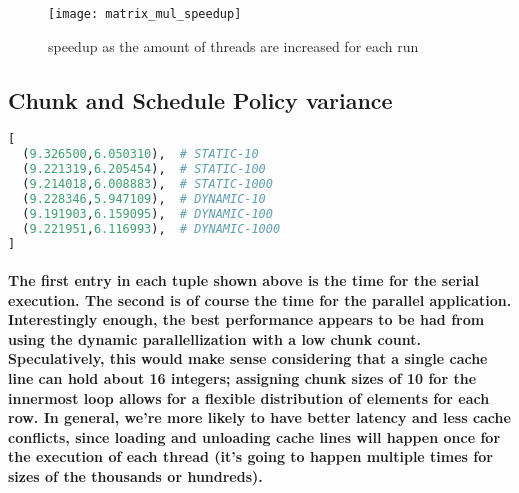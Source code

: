 \documentclass[8pt, a4paper, twoside, twoclumn, english]{extreport}
\begin{document}
\begin{figure}[h]
\caption{speedup as the amount of threads are increased for each run}
\centering
\texttt{[image: matrix\_mul\_speedup]}
\end{figure}

\subsection{Chunk and Schedule Policy variance}

\begin{lstlisting}[language=Python]
[
  (9.326500,6.050310),  # STATIC-10
  (9.221319,6.205454),  # STATIC-100
  (9.214018,6.008883),  # STATIC-1000
  (9.228346,5.947109),  # DYNAMIC-10
  (9.191903,6.159095),  # DYNAMIC-100
  (9.221951,6.116993),  # DYNAMIC-1000
]
\end{lstlisting}

\paragraph{The first entry in each tuple shown above is the time for the serial execution. The second is of course the time for the parallel application.
Interestingly enough, the best performance appears to be had from using the dynamic parallellization with a low chunk count. Speculatively, this would make sense considering that a single cache line can hold about 16 integers; assigning chunk sizes of 10 for the innermost loop allows for a flexible distribution of elements for each row. In general, we're more likely to have better latency and less cache conflicts, since loading and unloading cache lines will happen once for the execution of each thread (it's going to happen multiple times for sizes of the thousands or hundreds).}
\end{document}
